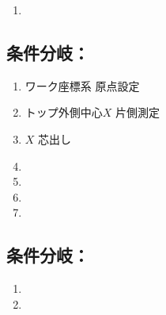 \begin{enumerate}[label=\sarrow]
\item \AlocationLength
\end{enumerate}



\clearpage


\subsection{条件分岐：\PMTopOutcutExists}

\begin{enumerate}[label=\sarrow]
\item ワーク座標系 原点設定
\item トップ外側中心$X$ 片側測定
\item \KeywayCenter$X$ 芯出し
\item \TopOutcutMilling
\item \KeywayMilling
\item \TopEndFaceOutChamferMilling
\item \CenterlineEndFaceDifMeasurement
\end{enumerate}


\subsection{条件分岐：\PMTopOutcutEndKeywayExists}

\begin{enumerate}[label=\sarrow]
\item \TopOutcutMilling
\item \TopCurvedOutcutMilling
\end{enumerate}


